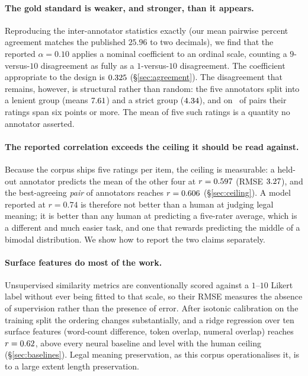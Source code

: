 \documentclass[11pt]{article}
\begin{document}
\paragraph{The gold standard is weaker, and stronger, than it appears.}
Reproducing the inter-annotator statistics exactly (our mean pairwise percent
agreement matches the published $25.96$ to two decimals), we find that the
reported $\alpha=0.10$ applies a nominal coefficient to an ordinal scale,
counting a $9$-versus-$10$ disagreement as fully as a $1$-versus-$10$
disagreement. The coefficient appropriate to the design is $0.325$
(\S\ref{sec:agreement}). The disagreement that remains, however, is structural
rather than random: the five annotators split into a lenient group (means
$7.61$) and a strict group ($4.34$), and on \pctSpreadSix\ of
pairs their ratings span six points or more. The mean of five such ratings is a
quantity no annotator asserted.

\paragraph{The reported correlation exceeds the ceiling it should be read against.}
Because the corpus ships five ratings per item, the ceiling is measurable: a
held-out annotator predicts the mean of the other four at $r=0.597$
(RMSE $3.27$), and the best-agreeing \emph{pair} of annotators reaches
$r=0.606$ (\S\ref{sec:ceiling}). A model reported at $r=0.74$ is therefore
not better than a human at judging legal meaning; it is better than any human at
predicting a five-rater average, which is a different and much easier task, and
one that rewards predicting the middle of a bimodal distribution. We show how to
report the two claims separately.

\paragraph{Surface features do most of the work.}
Unsupervised similarity metrics are conventionally scored against a $1$--$10$
Likert label without ever being fitted to that scale, so their RMSE measures the
absence of supervision rather than the presence of error. After isotonic
calibration on the training split the ordering changes substantially, and a
ridge regression over ten surface features (word-count difference, token
overlap, numeral overlap) reaches $r=0.62$, above every neural baseline and
level with the human ceiling (\S\ref{sec:baselines}). Legal meaning
preservation, as this corpus operationalises it, is to a large extent length
preservation.
\end{document}
